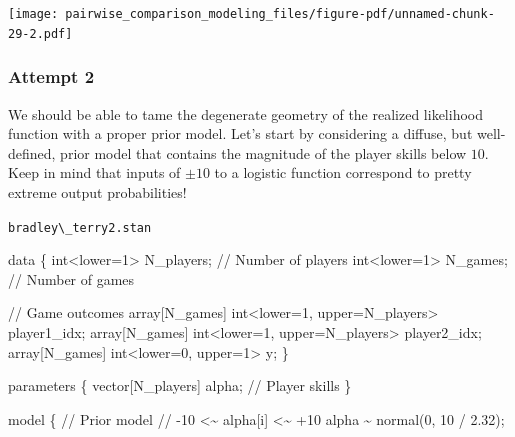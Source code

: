 \documentclass[
  letterpaper,
  DIV=11,
  numbers=noendperiod]{scrartcl}
\newenvironment{Shaded}{\begin{snugshade}}{\end{snugshade}}
\newcommand{\CommentTok}[1]{\textcolor[rgb]{0.37,0.37,0.37}{#1}}
\newcommand{\DataTypeTok}[1]{\textcolor[rgb]{0.68,0.00,0.00}{#1}}
\newcommand{\DecValTok}[1]{\textcolor[rgb]{0.68,0.00,0.00}{#1}}
\newcommand{\FloatTok}[1]{\textcolor[rgb]{0.68,0.00,0.00}{#1}}
\newcommand{\KeywordTok}[1]{\textcolor[rgb]{0.00,0.23,0.31}{#1}}
\newcommand{\NormalTok}[1]{\textcolor[rgb]{0.00,0.23,0.31}{#1}}
\begin{document}
\texttt{[image: pairwise\_comparison\_modeling\_files/figure-pdf/unnamed-chunk-29-2.pdf]}

\subsubsection{Attempt 2}\label{sec:demo-binary-comp-2}

We should be able to tame the degenerate geometry of the realized
likelihood function with a proper prior model. Let's start by
considering a diffuse, but well-defined, prior model that contains the
magnitude of the player skills below \(10\). Keep in mind that inputs of
\(\pm 10\) to a logistic function correspond to pretty extreme output
probabilities!

\begin{codelisting}

\caption{\texttt{bradley\textbackslash\_terry2.stan}}

\begin{Shaded}
\begin{Highlighting}[]
\KeywordTok{data}\NormalTok{ \{}
  \DataTypeTok{int}\NormalTok{\textless{}}\KeywordTok{lower}\NormalTok{=}\DecValTok{1}\NormalTok{\textgreater{} N\_players; }\CommentTok{// Number of players}
  \DataTypeTok{int}\NormalTok{\textless{}}\KeywordTok{lower}\NormalTok{=}\DecValTok{1}\NormalTok{\textgreater{} N\_games;   }\CommentTok{// Number of games}

  \CommentTok{// Game outcomes}
  \DataTypeTok{array}\NormalTok{[N\_games] }\DataTypeTok{int}\NormalTok{\textless{}}\KeywordTok{lower}\NormalTok{=}\DecValTok{1}\NormalTok{, }\KeywordTok{upper}\NormalTok{=N\_players\textgreater{} player1\_idx;}
  \DataTypeTok{array}\NormalTok{[N\_games] }\DataTypeTok{int}\NormalTok{\textless{}}\KeywordTok{lower}\NormalTok{=}\DecValTok{1}\NormalTok{, }\KeywordTok{upper}\NormalTok{=N\_players\textgreater{} player2\_idx;}
  \DataTypeTok{array}\NormalTok{[N\_games] }\DataTypeTok{int}\NormalTok{\textless{}}\KeywordTok{lower}\NormalTok{=}\DecValTok{0}\NormalTok{, }\KeywordTok{upper}\NormalTok{=}\DecValTok{1}\NormalTok{\textgreater{} y;}
\NormalTok{\}}

\KeywordTok{parameters}\NormalTok{ \{}
  \DataTypeTok{vector}\NormalTok{[N\_players] alpha; }\CommentTok{// Player skills}
\NormalTok{\}}

\KeywordTok{model}\NormalTok{ \{}
  \CommentTok{// Prior model}
  \CommentTok{// {-}10 \textless{}\textasciitilde{} alpha[i] \textless{}\textasciitilde{} +10}
\NormalTok{  alpha \textasciitilde{} normal(}\DecValTok{0}\NormalTok{, }\DecValTok{10}\NormalTok{ / }\FloatTok{2.32}\NormalTok{);}


\end{Highlighting}
\end{Shaded}
\end{codelisting}
\end{document}
